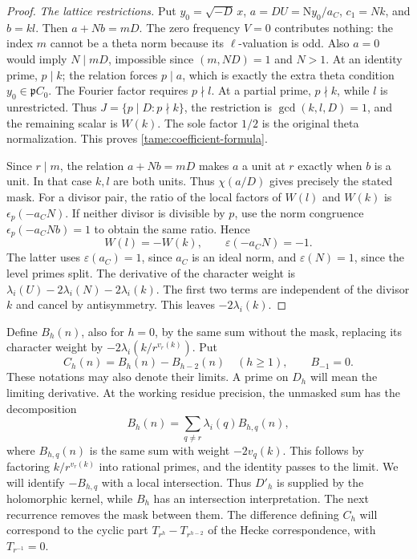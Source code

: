 \begin{proof}
\emph{The lattice restrictions.}
Put \(y_0=\sqrt{-D}\,x\),
\(a=DU=\mathrm Ny_0/a_C\), \(c_1=Nk\), and \(b=kl\).
Then \(a+Nb=mD\). The zero frequency \(V=0\) contributes nothing:
the index \(m\) cannot be a theta norm because its \(\ell\)-valuation
is odd. Also \(a=0\) would imply \(N\mid mD\), impossible since
\((m,ND)=1\) and \(N>1\).
At an identity prime, \(p\mid k\); the relation forces \(p\mid a\),
which is exactly the extra theta condition
\(y_0\in\mathfrak pC_0\). The Fourier factor requires \(p\nmid l\).
At a partial prime, \(p\nmid k\), while \(l\) is unrestricted.
Thus \(J=\{p\mid D:p\nmid k\}\), the restriction is
\(\gcd(k,l,D)=1\), and the remaining scalar is \(W(k)\).
The sole factor \(1/2\) is the original theta normalization.
This proves \eqref{tame:coefficient-formula}.

Since \(r\mid m\), the relation \(a+Nb=mD\) makes \(a\) a unit
at \(r\) exactly when \(b\) is a unit. In that case \(k,l\) are
both units. Thus \(\chi(a/D)\) gives precisely the stated mask.
For a divisor pair, the ratio of the local factors of \(W(l)\)
and \(W(k)\) is \(\epsilon_p(-a_CN)\). If neither divisor is
divisible by \(p\), use the norm congruence
\(\epsilon_p(-a_CNb)=1\) to obtain the same ratio.
Hence
\[
 W(l)=-W(k),\qquad
 \varepsilon(-a_CN)=-1.
\]
The latter uses \(\varepsilon(a_C)=1\), since \(a_C\) is an ideal
norm, and \(\varepsilon(N)=1\), since the level primes split.
The derivative of the character weight is
\(\lambda_i(U)-2\lambda_i(N)-2\lambda_i(k)\).
The first two terms are independent of the divisor \(k\) and
cancel by antisymmetry. This leaves \(-2\lambda_i(k)\).
\end{proof}

Define \(B_h(n)\), also for \(h=0\), by the same sum without the
mask, replacing its character weight by
\(-2\lambda_i(k/r^{v_r(k)})\). Put
\[
 C_h(n)=B_h(n)-B_{h-2}(n)\quad(h\ge1),\qquad B_{-1}=0.
\]
These notations may also denote their limits. A prime on \(D_h\)
will mean the limiting derivative. At the working residue precision,
the unmasked sum has the decomposition
\[
 B_h(n)=\sum_{q\ne r}\lambda_i(q)B_{h,q}(n),
\]
where \(B_{h,q}(n)\) is the same sum with weight \(-2v_q(k)\).
This follows by factoring \(k/r^{v_r(k)}\) into rational primes,
and the identity passes to the limit. We will identify \(-B_{h,q}\)
with a local intersection. Thus \(D'_h\)
is supplied by the holomorphic kernel, while \(B_h\) has an
intersection interpretation. The next recurrence removes the mask
between them. The difference defining \(C_h\) will correspond to
the cyclic part \(T_{r^h}-T_{r^{h-2}}\) of the Hecke correspondence,
with \(T_{r^{-1}}=0\).

